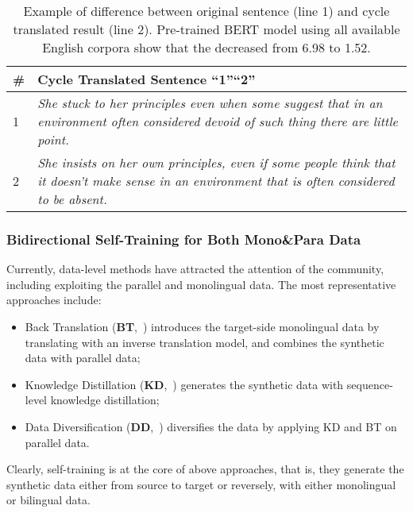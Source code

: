 \documentclass[11pt,a4paper]{article}
\newcommand{\zct}{\color{black}}
\begin{document}
\begin{table}[t!]
    \begin{center}
    \begin{tabular}{lp{6.4cm}}
    \toprule
    \# & \textbf{Cycle Translated Sentence ``1''``2''}\\
    \midrule
    1 & \textit{She stuck to her principles even when some suggest that in an environment often considered devoid of such thing there are little point.}\\ 
    \midrule
    2 & \textit{She insists on her own principles, even if some people think that it doesn't make sense in an environment that is often considered to be absent.}\\ 
    \bottomrule
    \end{tabular}
    \end{center}
    \caption{\label{tab:sentences}Example of difference between original sentence (line 1) and cycle translated result (line 2). Pre-trained BERT model using all available English corpora show that the  decreased from 6.98 to 1.52.}
    \end{table}

\subsubsection{Bidirectional Self-Training for Both Mono\&Para Data}
\label{ssec:bi-selftraining}
Currently, data-level methods have attracted the attention of the community, including exploiting the parallel and monolingual data.
The most representative approaches include: 
{\zct
\begin{itemize}
    \item Back Translation (\textbf{BT},~\citealt{sennrich-etal-2016-improving}) introduces the target-side monolingual data by translating with an inverse translation model, and combines the synthetic data with parallel data;
    \item Knowledge Distillation (\textbf{KD},~\citealt{kim-rush-2016-sequence}) generates the synthetic data with sequence-level knowledge distillation; 
    \item Data Diversification (\textbf{DD},~\citealt{NEURIPS2020_7221e5c8}) diversifies the data by applying KD and BT on parallel data. 
\end{itemize}
}
Clearly, self-training is at the core of above approaches, that is, they generate the synthetic data either from source to target or reversely, with either monolingual or bilingual data. 
\end{document}
